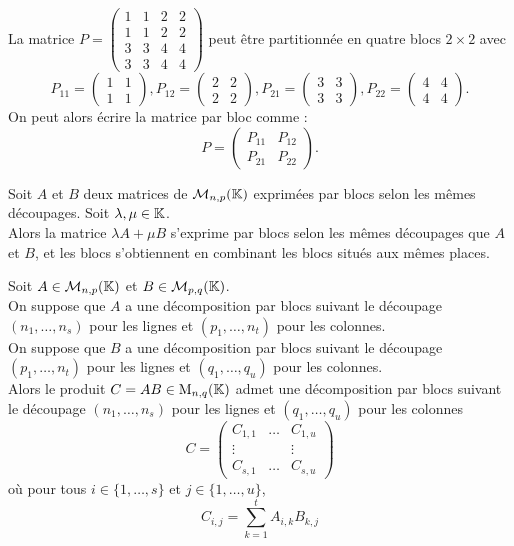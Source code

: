 \documentclass{book}
\begin{document}
\begin{Exemple}
La matrice ${P} ={\begin{pmatrix}1&1&2&2\\1&1&2&2\\3&3&4&4\\3&3&4&4\end{pmatrix}}$
peut être partitionnée en quatre blocs $2\times 2$ avec $$P_{11}={\begin{pmatrix}1&1\\1&1\end{pmatrix}},P_{12}={\begin{pmatrix}2&2\\2&2\end{pmatrix}},P_{21}={\begin{pmatrix}3&3\\3&3\end{pmatrix}},{P}_{22}={\begin{pmatrix}4&4\\4&4\end{pmatrix}}.$$
On peut alors écrire la matrice par bloc comme :
$$P={\begin{pmatrix} {P} _{11}& {P} _{12}\\ {P} _{21}& {P} _{22}\end{pmatrix}}.$$
\end{Exemple}
\begin{Proposition}
Soit $A$ et $B$ deux matrices de $\mathcal{M}_{n,p}(\mathbb{K})$ exprimées par blocs selon les mêmes découpages. Soit $\lambda ,\mu  \in  \mathbb{K} $.\\
Alors la matrice $\lambda A + \mu  B$ s'exprime par blocs selon les mêmes découpages que $A$ et $B$, et les blocs s'obtiennent en combinant les blocs situés aux mêmes places.
\end{Proposition}
\begin{Proposition}
Soit $A\in  \mathcal{M}_{n,p}(\mathbb{K})$ et $B\in  \mathcal{M}_{p,q}(\mathbb{K})$.\\
On suppose que $A$ a une décomposition par blocs suivant le découpage $(n_1,\dots,n_s)$ pour les lignes et $(p_1,\dots,n_t)$ pour les colonnes.\\
On suppose que $B$ a une décomposition par blocs suivant le découpage $(p_1,\dots,n_t)$ pour les lignes et $(q_1,\dots,q_u)$ pour les colonnes.\\
Alors le produit $C = AB\in  \mathrm{M}_{n,q}(\mathbb{K} )$ admet une décomposition par blocs suivant le découpage $(n_1,\dots,n_s)$ pour les lignes et $(q_1,\dots,q_u)$ pour les colonnes
\[ C = \begin{pmatrix} C_{1,1} &  \dots &  C_{1,u}  \\  \vdots &   &  \vdots  \\  C_{s,1} &  \dots &  C_{s,u} \end{pmatrix} \]
où pour tous $i\in  \{1,\dots,s\}$ et $j\in  \{1,\dots,u\}$,
\[ C_{i,j} = \sum  _{k=1}^t A_{i,k} B_{k,j} \]
\end{Proposition}
\end{document}
